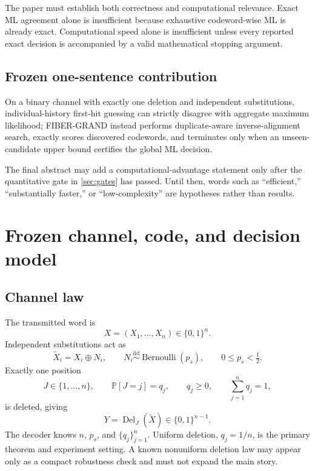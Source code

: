 \documentclass[11pt]{article}
\theoremstyle{definition}
\theoremstyle{remark}
\newcommand{\Prb}{\mathbb{P}}
\newcommand{\Del}{\operatorname{Del}}
\begin{document}
The paper must establish both correctness and computational relevance. Exact ML agreement alone is insufficient because exhaustive codeword-wise ML is already exact. Computational speed alone is insufficient unless every reported exact decision is accompanied by a valid mathematical stopping argument.

\subsection{Frozen one-sentence contribution}

\begin{freezebox}
On a binary channel with exactly one deletion and independent substitutions, individual-history first-hit guessing can strictly disagree with aggregate maximum likelihood; FIBER-GRAND instead performs duplicate-aware inverse-alignment search, exactly scores discovered codewords, and terminates only when an unseen-candidate upper bound certifies the global ML decision.
\end{freezebox}

The final abstract may add a computational-advantage statement only after the quantitative gate in \cref{sec:gates} has passed. Until then, words such as ``efficient,'' ``substantially faster,'' or ``low-complexity'' are hypotheses rather than results.

\section{Frozen channel, code, and decision model}

\subsection{Channel law}

The transmitted word is
\[
X=(X_1,\ldots,X_n)\in\{0,1\}^n.
\]
Independent substitutions act as
\[
\widetilde X_i=X_i\oplus N_i,
\qquad
N_i\stackrel{\mathrm{iid}}{\sim}\operatorname{Bernoulli}(p_s),
\qquad 0\le p_s<\tfrac12.
\]
Exactly one position
\[
J\in\{1,\ldots,n\},
\qquad
\Prb[J=j]=q_j,
\qquad
q_j\ge0,
\qquad
\sum_{j=1}^n q_j=1,
\]
is deleted, giving
\[
Y=\Del_J(\widetilde X)\in\{0,1\}^{n-1}.
\]
The decoder knows $n$, $p_s$, and $\{q_j\}_{j=1}^n$. Uniform deletion, $q_j=1/n$, is the primary theorem and experiment setting. A known nonuniform deletion law may appear only as a compact robustness check and must not expand the main story.
\end{document}
